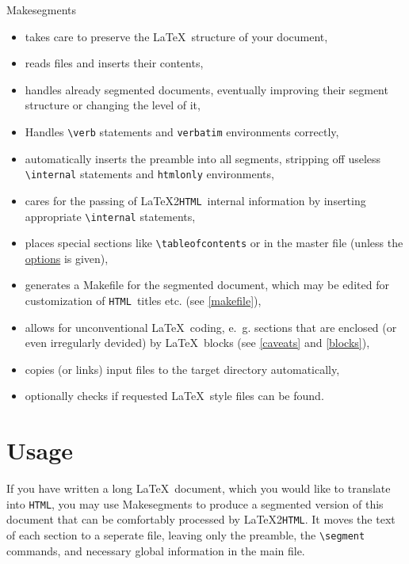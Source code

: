 \documentclass[a4paper,12pt]{article}
\newcommand{\htm}{{\tt HTML}}
\newcommand{\lhh}{{\rm \LaTeX2}\htm}
\begin{document}
Makesegments 
\begin{itemize}
\item takes care to preserve the \LaTeX\ structure of your document,
\item reads \verb:: files and inserts their
  contents,
\item handles already segmented documents, eventually improving their
  segment structure or changing the level of it,
\item Handles \verb:\verb: statements and \verb+verbatim+ environments
  correctly,
\item automatically inserts the preamble into all segments, stripping
  off useless \verb+\internal+ statements and \verb+htmlonly+ environments,
\item cares for the passing of \lhh\ internal information by inserting
  appropriate \verb:\internal: statements,
\item places special sections like \verb:\tableofcontents: or
  \verb:: in the master file (unless the
  \hyperref{\texttt{ -e} option}{\texttt{-e} option, see }{}{options}
  is given),
\item generates a Makefile for the segmented document, which may be
  edited for customization of \htm\ titles etc. (see \ref{makefile}),
\item allows for unconventional \LaTeX\ coding, e.~g. sections that
  are enclosed (or even irregularly devided) by \LaTeX\ blocks (see
  \ref{caveats} and \ref{blocks}), 
\item copies (or links) input files to the target directory
  automatically, 
\item optionally checks if requested \LaTeX\ style files can be found.
\end{itemize}

\section{Usage}
\label{usage}

If you have written a long \LaTeX\ document, which you would like to
translate into \htm, you may use Makesegments to produce a segmented
version of this document that can be comfortably processed by \lhh.
It moves the text of each section to a seperate file, leaving only
the preamble, the \verb:\segment:
commands, and necessary global 
information in the main file.
\end{document}
